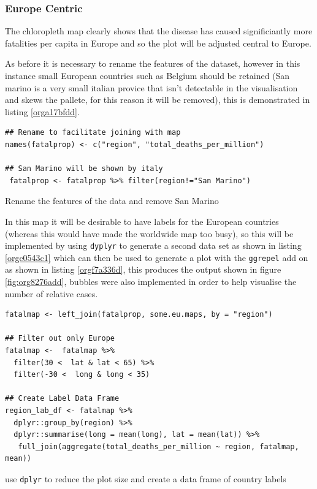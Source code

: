 \documentclass[11pt]{article}
\begin{document}
\subsubsection{Europe Centric}
\label{sec:orgfbfc7a1}
The chloropleth map clearly shows that the disease has caused significiantly more fatalities
per capita in Europe and so the plot will be adjusted central to Europe.

As before it is necessary to rename the features of the dataset, however in this
instance small European countries such as Belgium should be retained (San marino
is a very small italian provice that isn't detectable in the visualisation and
skews the pallete, for this reason it will be removed), this is demonstrated in
listing \ref{orga17bfdd}.

\begin{listing}[htbp]
\begin{verbatim}
## Rename to facilitate joining with map
names(fatalprop) <- c("region", "total_deaths_per_million")

## San Marino will be shown by italy
 fatalprop <- fatalprop %>% filter(region!="San Marino")
\end{verbatim}
\caption{\label{orga17bfdd}Rename the features of the data and remove San Marino}
\end{listing}

In this map it will be desirable to have labels for the European countries
(whereas this would have made the worldwide map too busy), so this will be
implemented by using \texttt{dyplyr} to generate a second data set as shown in listing
\ref{orgc0543c1} which can then be used to generate a plot with the \texttt{ggrepel} add on as shown in listing \ref{orgf7a336d}, this
produces the output shown in figure \ref{fig:org8276add}, bubbles were also implemented in order to help visualise the number of relative cases.

\begin{listing}[htbp]
\begin{verbatim}
fatalmap <- left_join(fatalprop, some.eu.maps, by = "region")

## Filter out only Europe
fatalmap <-  fatalmap %>%
  filter(30 <  lat & lat < 65) %>%
  filter(-30 <  long & long < 35)

## Create Label Data Frame
region_lab_df <- fatalmap %>%
  dplyr::group_by(region) %>%
  dplyr::summarise(long = mean(long), lat = mean(lat)) %>%
   full_join(aggregate(total_deaths_per_million ~ region, fatalmap, mean))
\end{verbatim}
\caption{\label{orgc0543c1}use \texttt{dplyr} to reduce the plot size and create a data frame of country labels}
\end{listing}
\end{document}
